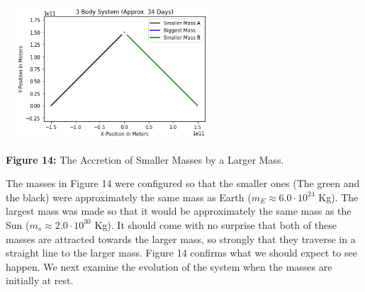 \documentclass[]{article}
\begin{document}
\begin{multicols}{2}
\begin{center}
\includegraphics[width=8cm, height=5cm]{PHYS 342 FP 3-Body Dynamics (2).png}
\caption{\small{\textbf{Figure 14:}} \tiny{The Accretion of Smaller Masses by a Larger Mass.}}
\end{center}
The masses in Figure 14 were configured so that the smaller ones (The green and the black) were approximately the same mass as Earth ($m_E\approx6.0\cdot10^{24}$ Kg). The largest mass was made so that it would be approximately the same mass as the Sun ($m_s\approx2.0\cdot10^{30}$ Kg). It should come with no surprise that both of these masses are attracted towards the larger mass, so strongly that they traverse in a straight line to the larger mass. Figure 14 confirms what we should expect to see happen. We next examine the evolution of the system when the masses are initially at rest.
\par

\end{multicols}
\end{document}
